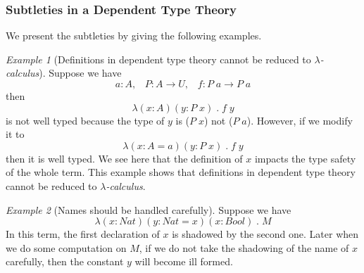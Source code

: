 \documentclass{article}
\theoremstyle{remark}
\newtheorem{example}{Example}[section]
\begin{document}
\subsubsection{Subtleties in a Dependent Type Theory}
We present the subtleties by giving the following examples. 

\begin{example}[Definitions in dependent type theory cannot be reduced to \emph{$\lambda$-calculus}] \label{exa1}
  Suppose we have
  \[ a : A, \;\;\; P : A \to U, \;\;\; f : P \; a \to P \; a \]
  then
  \[ \lambda (x : A) (y : P \; x) \; . \; f \; y \]
  is not well typed because the type of $y$ is ($P \; x$) not ($P \; a$). However, if we modify it to
  \[ \lambda (x : A = a) (y : P \; x) \; . \; f \; y \]
  then it is well typed. We see here that the definition of $x$ impacts the type safety of the whole term. This example shows that definitions in dependent type theory cannot be reduced to \emph{$\lambda$-calculus}.
\end{example}

\begin{example}[Names should be handled carefully] \label{exa2}
  Suppose we have
  \[ \lambda (x : Nat) (y : Nat = x) (x : Bool) \; . \; M \]
  In this term, the first declaration of $x$ is shadowed by the second one. Later when we do some computation on $M$, if we do not take the shadowing of the name of $x$ carefully, then the constant $y$ will become ill formed.
\end{example}
\end{document}
